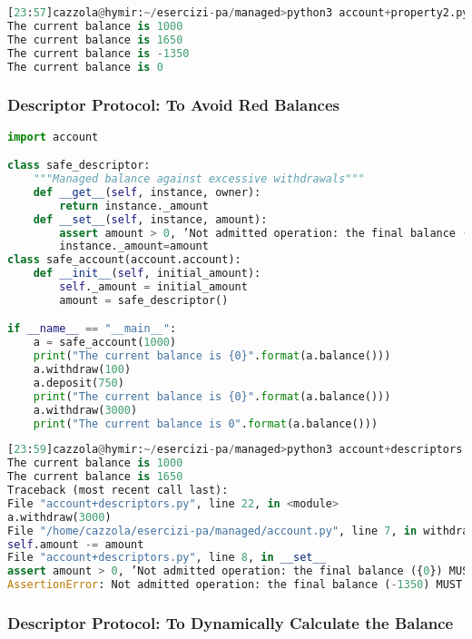 \begin{lstlisting}[language=Python]
[23:57]cazzola@hymir:~/esercizi-pa/managed>python3 account+property2.py
The current balance is 1000
The current balance is 1650
The current balance is -1350
The current balance is 0
\end{lstlisting}

\subsubsection{Descriptor Protocol: To Avoid Red Balances}

\begin{lstlisting}[language=Python]
import account

class safe_descriptor:
	"""Managed balance against excessive withdrawals"""
	def __get__(self, instance, owner):
		return instance._amount
	def __set__(self, instance, amount):
		assert amount > 0, ’Not admitted operation: the final balance ({0}) MUST be positive’.format(amount)
		instance._amount=amount
class safe_account(account.account):
	def __init__(self, initial_amount):
		self._amount = initial_amount
		amount = safe_descriptor()

if __name__ == "__main__":
	a = safe_account(1000)
	print("The current balance is {0}".format(a.balance()))
	a.withdraw(100)
	a.deposit(750)
	print("The current balance is {0}".format(a.balance()))
	a.withdraw(3000)
	print("The current balance is 0".format(a.balance()))
\end{lstlisting}

\begin{lstlisting}[language=Python]
[23:59]cazzola@hymir:~/esercizi-pa/managed>python3 account+descriptors.py
The current balance is 1000
The current balance is 1650
Traceback (most recent call last):
File "account+descriptors.py", line 22, in <module>
a.withdraw(3000)
File "/home/cazzola/esercizi-pa/managed/account.py", line 7, in withdraw
self.amount -= amount
File "account+descriptors.py", line 8, in __set__
assert amount > 0, ’Not admitted operation: the final balance ({0}) MUST be positive’.format(amount)
AssertionError: Not admitted operation: the final balance (-1350) MUST be positive
\end{lstlisting}

\subsubsection{Descriptor Protocol: To Dynamically Calculate the Balance}

